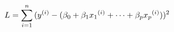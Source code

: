 \documentclass[preview]{standalone}
\begin{document}
\begin{align*}
{\special{dvisvgm:raw <g id='unique000'>}L=\sum_{i=1}^n{(y^{(i)}-(\beta_0+\beta_1 {x_1}^{(i)}+\dots+\beta_p {x_p}^{(i)}}))^2}\special{dvisvgm:raw </g>}
\end{align*}
\end{document}
